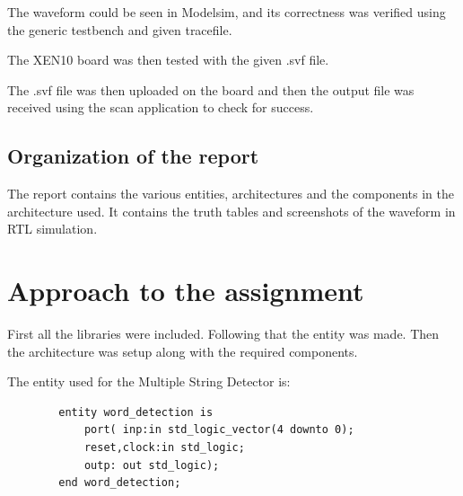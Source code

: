\documentclass[12pt]{article}
\begin{document}
	The waveform could be seen in Modelsim, and its correctness was verified using the generic testbench and given tracefile.

	The XEN10 board was then tested with the given .svf file.
	
	The .svf file was then uploaded on the board and then the output file was received using the scan application to check for success.
	
	\subsection{Organization of the report}
	
	The report contains the various entities, architectures and the components in the architecture used. It contains the truth tables and screenshots of the waveform in RTL simulation.
	
	\section{Approach to the assignment}

	First all the libraries were included. Following that the entity was made. Then the architecture was setup along with the required components.

	The entity used for the Multiple String Detector is:
	\begin{verbatim}
		entity word_detection is
			port( inp:in std_logic_vector(4 downto 0);
			reset,clock:in std_logic;
			outp: out std_logic);
		end word_detection;


	\end{verbatim}
\end{document}
